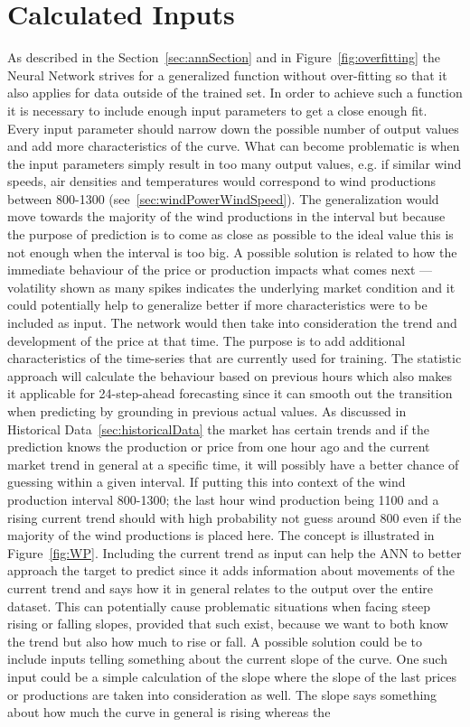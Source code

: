 \section{Calculated Inputs}
\label{sec:usingStatisticalInput}
As described in the Section~\ref{sec:annSection} and in Figure~\ref{fig:overfitting} the Neural Network strives for a generalized function without over-fitting so that it also applies for data outside of the trained set. In order to achieve such a function it is necessary to include enough input parameters to get a close enough fit. Every input parameter should narrow down the possible number of output values and add more characteristics of the curve. What can become problematic is when the input parameters simply result in too many output values, e.g. if similar wind speeds, air densities and temperatures would correspond to wind productions between 800-1300 (see~\ref{sec:windPowerWindSpeed}). The generalization would move towards the majority of the wind productions in the interval but because the purpose of prediction is to come as close as possible to the ideal value this is not enough when the interval is too big. A possible solution is related to how the immediate behaviour of the price or production impacts what comes next --- volatility shown as many spikes indicates the underlying market condition\cite{yamin2004adaptive} and it could potentially help to generalize better if more characteristics were to be included as input. The network would then take into consideration the trend and development of the price at that time. The purpose is to add additional characteristics of the time-series that are currently used for training. The statistic approach will calculate the behaviour based on previous hours which also makes it applicable for 24-step-ahead forecasting since it can smooth out the transition when predicting by grounding in previous actual values. As discussed in Historical Data~\ref{sec:historicalData} the market has certain trends and if the prediction knows the production or price from one hour ago and the current market trend in general at a specific time, it will possibly have a better chance of guessing within a given interval. If putting this into context of the wind production interval 800-1300; the last hour wind production being 1100 and a rising current trend should with high probability not guess around 800 even if the majority of the wind productions is placed here. The concept is illustrated in Figure~\ref{fig:WP}. Including the current trend as input can help the ANN to better approach the target to predict since it adds information about movements of the current trend and says how it in general relates to the output over the entire dataset. This can potentially cause problematic situations when facing steep rising or falling slopes, provided that such exist, because we want to both know the trend but also how much to rise or fall. A possible solution could be to include inputs telling something about the current slope of the curve. One such input could be a simple calculation of the slope where the slope of the last prices or productions are taken into consideration as well. The slope says something about how much the curve in general is rising whereas the 